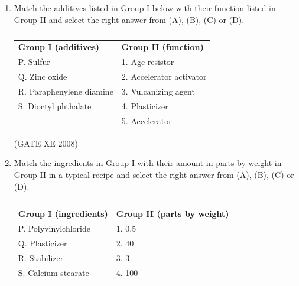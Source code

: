 \documentclass[12pt]{article}
\begin{document}
\begin{enumerate}
(GATE XE 2008)

\item Match the additives listed in Group I below with their function listed in Group II and select the right answer from (A), (B), (C) or (D).

\begin{table}[H]     \centering     \caption{}     \label{}     \begin{tabular}{l l}
\textbf{Group I (additives)} & \textbf{Group II (function)} \\
P. Sulfur & 1. Age resistor \\
Q. Zinc oxide & 2. Accelerator activator \\
R. Paraphenylene diamine & 3. Vulcanizing agent \\
S. Dioctyl phthalate & 4. Plasticizer \\
& 5. Accelerator \\
\end{tabular} \end{table}

\begin{enumerate}
\end{enumerate}

(GATE XE 2008)

\item Match the ingredients in Group I with their amount in parts by weight in Group II in a typical recipe and select the right answer from (A), (B), (C) or (D).

\begin{table}[H]     \centering     \caption{}     \label{}     \begin{tabular}{l l}
\textbf{Group I (ingredients)} & \textbf{Group II (parts by weight)} \\
P. Polyvinylchloride & 1. 0.5 \\
Q. Plasticizer & 2. 40 \\
R. Stabilizer & 3. 3 \\
S. Calcium stearate & 4. 100 \\
\end{tabular} \end{table}


\end{enumerate}
\end{document}
